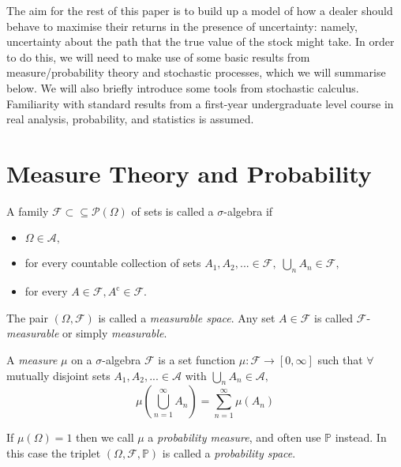 The aim for the rest of this paper is to build up a model of how a dealer should behave to maximise their returns in the presence of uncertainty: 
namely, uncertainty about the path that the true value of the stock might take. 
In order to do this, we will need to make use of some basic results from measure/probability theory and stochastic processes, which we will
summarise below. We will also briefly introduce some tools from stochastic calculus. Familiarity with standard results 
from a first-year undergraduate level course in real analysis, probability, and statistics is assumed.

\section{Measure Theory and Probability}

\begin{definition}
    A family $\mathcal{F}\subset\subseteq\mathcal{P}(\Omega)$ of sets is called a $\sigma$-algebra if 
    \begin{itemize}
        \item $\Omega\in\mathcal{A},$
        \item for every countable collection of sets $A_1,A_2,...\in\mathcal{F},\;\bigcup_{n}A_n\in\mathcal{F},$
        \item for every $A\in\mathcal{F}, A^{\mathrm c}\in\mathcal{F}.$
    \end{itemize}
\end{definition}

\begin{remark}
    The pair $(\Omega,\mathcal{F})$ is called a \emph{measurable space}. Any set $A\in\mathcal{F}$
    is called $\mathcal{F}$-\emph{measurable} or simply \emph{measurable}.
\end{remark}

\begin{definition}
    A \emph{measure} $\mu$ on a $\sigma$-algebra $\mathcal{F}$ is a set function
    $\mu:\mathcal{F}\rightarrow[0,\infty]$ such that $\forall$ mutually disjoint
    sets $A_1,A_2,...\in\mathcal{A}$ with $\bigcup_nA_n\in\mathcal{A},$
    \begin{equation}
        \mu\left(\bigcup_{n=1}^{\infty}A_n\right)=\sum_{n=1}^{\infty}\mu(A_n)
    \end{equation}
\end{definition}

\begin{remark}
    If $\mu(\Omega)=1$ then we call $\mu$ a \emph{probability measure}, and often
    use $\mathbb{P}$ instead. In this case the triplet $(\Omega,\mathcal{F},\mathbb{P})$
    is called a \emph{probability space}.
\end{remark}


